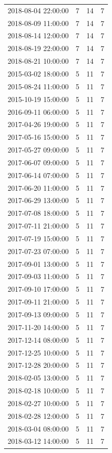 \begin{tabular}{lrrr}
2018-08-04 22:00:00 & 7 & 14 & 7 \\
2018-08-09 11:00:00 & 7 & 14 & 7 \\
2018-08-14 12:00:00 & 7 & 14 & 7 \\
2018-08-19 22:00:00 & 7 & 14 & 7 \\
2018-08-21 10:00:00 & 7 & 14 & 7 \\
2015-03-02 18:00:00 & 5 & 11 & 7 \\
2015-08-24 11:00:00 & 5 & 11 & 7 \\
2015-10-19 15:00:00 & 5 & 11 & 7 \\
2016-09-11 06:00:00 & 5 & 11 & 7 \\
2017-04-26 19:00:00 & 5 & 11 & 7 \\
2017-05-16 15:00:00 & 5 & 11 & 7 \\
2017-05-27 09:00:00 & 5 & 11 & 7 \\
2017-06-07 09:00:00 & 5 & 11 & 7 \\
2017-06-14 07:00:00 & 5 & 11 & 7 \\
2017-06-20 11:00:00 & 5 & 11 & 7 \\
2017-06-29 13:00:00 & 5 & 11 & 7 \\
2017-07-08 18:00:00 & 5 & 11 & 7 \\
2017-07-11 21:00:00 & 5 & 11 & 7 \\
2017-07-19 15:00:00 & 5 & 11 & 7 \\
2017-07-23 07:00:00 & 5 & 11 & 7 \\
2017-09-01 13:00:00 & 5 & 11 & 7 \\
2017-09-03 11:00:00 & 5 & 11 & 7 \\
2017-09-10 17:00:00 & 5 & 11 & 7 \\
2017-09-11 21:00:00 & 5 & 11 & 7 \\
2017-09-13 09:00:00 & 5 & 11 & 7 \\
2017-11-20 14:00:00 & 5 & 11 & 7 \\
2017-12-14 08:00:00 & 5 & 11 & 7 \\
2017-12-25 10:00:00 & 5 & 11 & 7 \\
2017-12-28 20:00:00 & 5 & 11 & 7 \\
2018-02-05 13:00:00 & 5 & 11 & 7 \\
2018-02-18 10:00:00 & 5 & 11 & 7 \\
2018-02-27 10:00:00 & 5 & 11 & 7 \\
2018-02-28 12:00:00 & 5 & 11 & 7 \\
2018-03-04 08:00:00 & 5 & 11 & 7 \\
2018-03-12 14:00:00 & 5 & 11 & 7 \\

\end{tabular}
